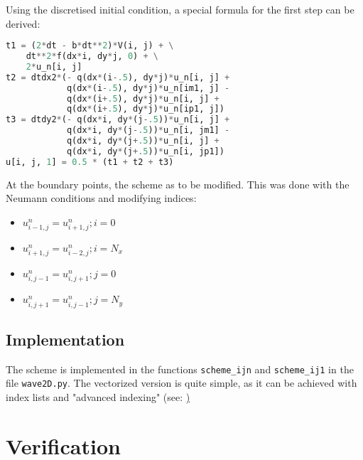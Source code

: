 \documentclass{report}
\begin{document}
        Using the discretised initial condition, a special formula for the first step can be derived:
        \begin{lstlisting}[language=Python]
t1 = (2*dt - b*dt**2)*V(i, j) + \
    dt**2*f(dx*i, dy*j, 0) + \
    2*u_n[i, j]
t2 = dtdx2*(- q(dx*(i-.5), dy*j)*u_n[i, j] +
            q(dx*(i-.5), dy*j)*u_n[im1, j] -
            q(dx*(i+.5), dy*j)*u_n[i, j] +
            q(dx*(i+.5), dy*j)*u_n[ip1, j])
t3 = dtdy2*(- q(dx*i, dy*(j-.5))*u_n[i, j] +
            q(dx*i, dy*(j-.5))*u_n[i, jm1] -
            q(dx*i, dy*(j+.5))*u_n[i, j] +
            q(dx*i, dy*(j+.5))*u_n[i, jp1])
u[i, j, 1] = 0.5 * (t1 + t2 + t3)
        \end{lstlisting}
        At the boundary points, the scheme as to be modified. This was done with the Neumann conditions and modifying indices:
        \begin{itemize}
        \item $u^{n}_{i-1,j}=u^{n}_{i+1,j}; i = 0$
        \item $u^{n}_{i+1,j}=u^{n}_{i-2,j}; i = N_x$
        \item $u^{n}_{i,j-1}=u^{n}_{i,j+1}; j = 0$
        \item $u^{n}_{i,j+1}=u^{n}_{i,j-1}; j = N_y$
        \end{itemize}
        
        
        \section*{Implementation}
        
        The scheme is implemented in the functions
        \texttt{scheme\_ijn}
        and \texttt{scheme\_ij1} in the file 
        \texttt{wave2D.py}.
        The vectorized version is quite simple, as it can be achieved with index lists and "advanced indexing" (see: \href{https://docs.scipy.org/doc/numpy-1.17.0/reference/arrays.indexing.html#advanced-indexing})

        
        \chapter*{Verification}
        
\end{document}
